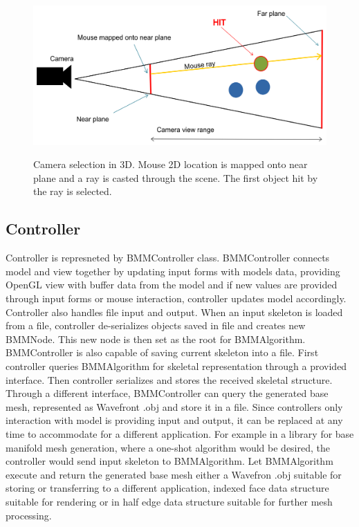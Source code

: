 \begin{figure}[h]
    \centering
    \includegraphics[width=\textwidth]{images/camera_selection}
    \label{fig:camera_selection}
    \caption[Camera selection]{Camera selection in 3D. Mouse 2D location is mapped onto near plane and a ray is casted through the scene. The first object hit by the ray is selected.}
\end{figure}

\subsection{Controller}

Controller is represneted by BMMController class.
BMMController connects model and view together by updating input forms with models data, providing OpenGL view with buffer data from the model and if new values are provided through input forms or mouse interaction, controller updates model accordingly.
Controller also handles file input and output.
When an input skeleton is loaded from a file, controller de-serializes objects saved in file and creates new BMMNode.
This new node is then set as the root for BMMAlgorithm.
BMMController is also capable of saving current skeleton into a file.
First controller queries BMMAlgorithm for skeletal representation through a provided interface.
Then controller serializes and stores the received skeletal structure.
Through a different interface, BMMController can query the generated base mesh, represented as Wavefront .obj and store it in a file.
Since controllers only interaction with model is providing input and output, it can be replaced at any time to accommodate for a different application.
For example in a library for base manifold mesh generation, where a one-shot algorithm would be desired, the controller would  send input skeleton to BMMAlgorithm.
Let BMMAlgorithm execute and return the generated base mesh either a Wavefron .obj suitable for storing or transferring to a different application, indexed face data structure suitable for rendering or in half edge data structure suitable for further mesh processing.

